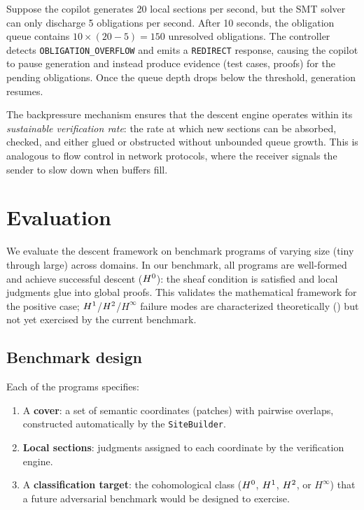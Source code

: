 \documentclass[11pt]{article}
\begin{document}
\begin{example}\label{ex:backpressure}
Suppose the copilot generates 20 local sections per second, but the
SMT solver can only discharge 5 obligations per second.  After 10
seconds, the obligation queue contains $10 \times (20 - 5) = 150$
unresolved obligations.  The controller detects
\texttt{OBLIGATION\_OVERFLOW} and emits a \texttt{REDIRECT} response,
causing the copilot to pause generation and instead produce evidence
(test cases, proofs) for the pending obligations.  Once the queue depth
drops below the threshold, generation resumes.
\end{example}

The backpressure mechanism ensures that the descent engine operates within
its \emph{sustainable verification rate}: the rate at which new sections can
be absorbed, checked, and either glued or obstructed without unbounded queue
growth.  This is analogous to flow control in network protocols, where the
receiver signals the sender to slow down when buffers fill.


\section{Evaluation}\label{sec:evaluation}

We evaluate the descent framework on \compTotalPrograms{} benchmark programs
of varying size (tiny through large) across \expDomainCount{} domains.
In our benchmark, all programs are well-formed and achieve successful
descent ($H^{0}$): the sheaf condition is satisfied and local judgments
glue into global proofs.  This validates the mathematical framework for
the positive case; $H^{1}$/$H^{2}$/$H^{\infty}$ failure modes
are characterized theoretically () but not yet
exercised by the current benchmark.

\subsection{Benchmark design}

Each of the \compTotalPrograms{} programs specifies:
\begin{enumerate}[leftmargin=*]
\item A \textbf{cover}: a set of semantic coordinates (patches) with
  pairwise overlaps, constructed automatically by the \texttt{SiteBuilder}.
\item \textbf{Local sections}: judgments assigned to each coordinate by
  the verification engine.
\item A \textbf{classification target}: the cohomological class
  ($H^{0}$, $H^{1}$, $H^{2}$, or $H^{\infty}$) that a future
  adversarial benchmark would be designed to exercise.
\end{enumerate}
\end{document}
